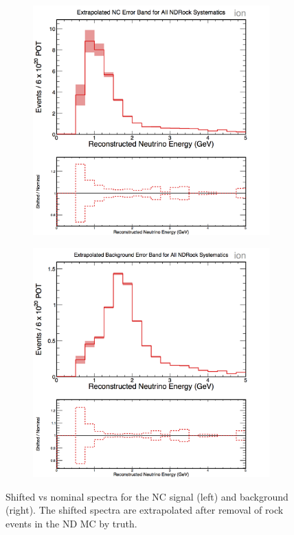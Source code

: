 \begin{figure}[h]
  \centering
  \begin{subfigure}{.48\textwidth}
    \centering
    \includegraphics[width=1\linewidth]{figures/cNCEXNDRockSysts.png}
  \end{subfigure}
  \begin{subfigure}{.48\textwidth}
    \centering
    \includegraphics[width=1\linewidth]{figures/cBGEXNDRockSysts.png}
  \end{subfigure}
  \caption[ND Rock Contamination Shifted Spectra]{Shifted vs nominal spectra for the NC signal (left) and background (right). The shifted spectra are extrapolated after removal of rock events in the ND MC by truth.}
  \label{fig:SystNDRock}
\end{figure}

